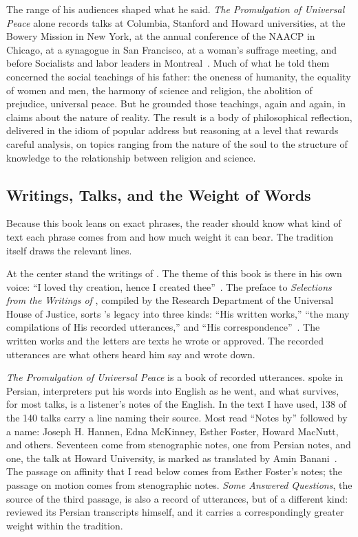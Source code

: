 The range of his audiences shaped what he said.
\textit{The Promulgation of Universal Peace} alone records talks at Columbia,
Stanford and Howard universities, at the Bowery Mission in New York, at the
annual conference of the NAACP in Chicago, at a synagogue in San Francisco, at
a woman's suffrage meeting, and before Socialists and labor leaders in
Montreal~\citep{PUP}.
Much of what he told them concerned the social teachings of his father: the
oneness of humanity, the equality of women and men, the harmony of science
and religion, the abolition of prejudice, universal peace.
But he grounded those teachings, again and again, in claims about the nature
of reality.
The result is a body of philosophical reflection, delivered in the idiom
of popular address but reasoning at a level that rewards careful analysis,
on topics ranging from the nature of the soul to the structure of knowledge
to the relationship between religion and science.

\subsection*{Writings, Talks, and the Weight of Words}

Because this book leans on exact phrases, the reader should know what kind of
text each phrase comes from and how much weight it can bear.
The tradition itself draws the relevant lines.

At the center stand the writings of \Bahaullah.
The theme of this book is there in his own voice: ``I loved thy creation,
hence I created thee''~\citep[Arabic no.~4]{HiddenWords}.
The preface to \textit{Selections from the Writings of \AbdulBaha}, compiled
by the Research Department of the Universal House of Justice, sorts
\AbdulBaha's legacy into three kinds: ``His written works,'' ``the many
compilations of His recorded utterances,'' and ``His
correspondence''~\citep[Preface]{SelectionsAbdul}.
The written works and the letters are texts he wrote or approved.
The recorded utterances are what others heard him say and wrote down.

\textit{The Promulgation of Universal Peace} is a book of recorded utterances.
\AbdulBaha spoke in Persian, interpreters put his words into English as he
went, and what survives, for most talks, is a listener's notes of the English.
In the text I have used, 138 of the 140 talks carry a line naming their
source.
Most read ``Notes by'' followed by a name: Joseph H. Hannen, Edna McKinney,
Esther Foster, Howard MacNutt, and others.
Seventeen come from stenographic notes, one from Persian notes, and one, the
talk at Howard University, is marked as translated by Amin Banani~\citep{PUP}.
The passage on affinity that I read below comes from Esther Foster's notes;
the passage on motion comes from stenographic notes.
\textit{Some Answered Questions}, the source of the third passage, is also a
record of utterances, but of a different kind: \AbdulBaha reviewed its Persian
transcripts himself, and it carries a correspondingly greater weight within
the tradition.


